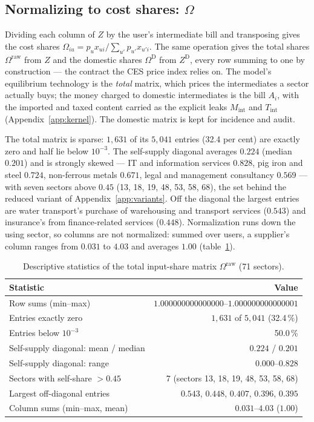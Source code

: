 \subsection{Normalizing to cost shares: $\Omega$}\label{app:pipeline-omega}

Dividing each column of $Z$ by the user's intermediate bill and transposing
gives the cost shares $\Omega_{iu}=p_ux_{ui}/\sum_{u'}p_{u'}x_{u'i}$. The same operation
gives the total shares $\Omega^{\mathrm{raw}}$ from $Z$ and the domestic shares
$\Omega^{\mathrm{D}}$ from $Z^{\mathrm{D}}$, every row summing to one by
construction --- the contract the CES price index relies on. The model's
equilibrium technology is the \emph{total} matrix, which prices the intermediates
a sector actually buys; the money charged to domestic intermediates is the bill $A_i$,
with the imported and taxed content carried as the explicit leaks
$M_{\mathrm{int}}$ and $T_{\mathrm{int}}$ (Appendix~\ref{app:kernel}). The
domestic matrix is kept for incidence and audit.

The total matrix is sparse: $1{,}631$ of its
$5{,}041$ entries (32.4 per cent) are exactly zero and half lie below $10^{-3}$.
The self-supply diagonal averages $0.224$ (median $0.201$) and is strongly
skewed --- IT and information services $0.828$, pig iron and steel $0.724$,
non-ferrous metals $0.671$, legal and management consultancy $0.569$ --- with
seven sectors above $0.45$ (13, 18, 19, 48, 53, 58, 68), the set behind the
reduced variant of Appendix~\ref{app:variants}. Off the diagonal the largest
entries are water transport's purchase of warehousing and transport services
($0.543$) and insurance's from finance-related services ($0.448$). Normalization
runs down the using sector, so
columns are not normalized: summed over users, a supplier's column ranges from
$0.031$ to $4.03$ and averages $1.00$ (table~\ref{tab:pipeline-omega}).

\begin{table}[t]
\centering
\caption{Descriptive statistics of the total input-share matrix $\Omega^{\mathrm{raw}}$ (71 sectors).}
\label{tab:pipeline-omega}
\small
\begin{tabular}{lr}
\toprule
Statistic & Value \\
\midrule
Row sums (min--max) & $1.000000000000000$--$1.000000000000001$ \\
Entries exactly zero & $1{,}631$ of $5{,}041$ (32.4\,\%) \\
Entries below $10^{-3}$ & 50.0\,\% \\
Self-supply diagonal: mean / median & $0.224$ / $0.201$ \\
Self-supply diagonal: range & $0.000$--$0.828$ \\
Sectors with self-share $>0.45$ & 7 (sectors 13, 18, 19, 48, 53, 58, 68) \\
Largest off-diagonal entries & $0.543$, $0.448$, $0.407$, $0.396$, $0.395$ \\
Column sums (min--max, mean) & $0.031$--$4.03$ ($1.00$) \\
\bottomrule
\end{tabular}
\end{table}

